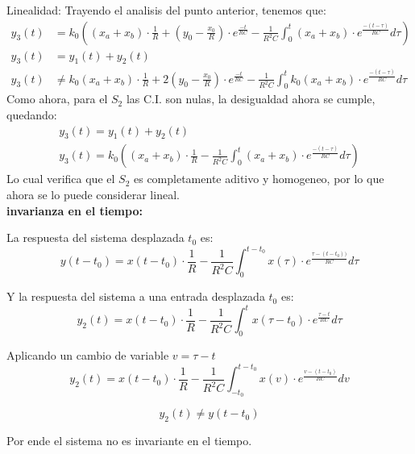 \documentclass[12pt,a4paper]{report}
\begin{document}
\begin{enumerate}[label=\alph*)]
      Linealidad: Trayendo el analisis del punto anterior, tenemos que:
      \begin{align*}
        y_3(t) &= k_0\left((x_a + x_b) \cdot \frac{1}{R} + \left(y_0 - \frac{x_0}{R}\right) \cdot e^{\frac{-t}{RC}} -
          \frac{1}{R^2C} \int_{0}^{t} (x_a + x_b) \cdot e^{\frac{-(t-\tau)}{RC}} d\tau\right)\\[12pt]
        y_3(t) &= y_1(t) + y_2(t)\\[6pt]
        y_3(t) &\neq k_0(x_a + x_b) \cdot \frac{1}{R} + 2\left(y_0 - \frac{x_0}{R}\right) \cdot
          e^{\frac{-t}{RC}} - \frac{1}{R^2C} \int_{0}^{t} k_0(x_a + x_b) \cdot e^{\frac{-(t-\tau)}{RC}} d\tau
      \end{align*}
      Como ahora, para el $S_2$ las C.I. son nulas, la desigualdad ahora se cumple, quedando:
      \begin{gather*}
        y_3(t) = y_1(t) + y_2(t)\\[6pt]
        y_3(t) = k_0\left((x_a + x_b) \cdot \frac{1}{R} - \frac{1}{R^2C} \int_{0}^{t} (x_a + x_b) \cdot
        e^{\frac{-(t-\tau)}{RC}} d\tau\right)
      \end{gather*}
      Lo cual verifica que el $S_2$ es completamente aditivo y homogeneo, por lo que ahora se lo puede considerar
      lineal.\\

      \textbf{invarianza en el tiempo:}

      La respuesta del sistema desplazada $t_0$ es:
      $$y(t - t_0) = x(t - t_0) \cdot \frac{1}{R}- \frac{1}{R^2C} \int_{0}^{t - t_0} x(\tau) \cdot
      e^{\frac{\tau-(t - t_0))}{RC}} d\tau$$

      Y la respuesta del sistema a una entrada desplazada $t_0$ es:
      $$y_2(t) = x(t-t_0) \cdot \frac{1}{R}- \frac{1}{R^2C} \int_{0}^{t} x(\tau - t_0) \cdot
      e^{\frac{\tau-t}{RC}} d\tau$$

      Aplicando un cambio de variable $v= \tau-t$
      $$y_2(t) = x(t-t_0) \cdot \frac{1}{R}- \frac{1}{R^2C} \int_{-t_0}^{t-t_0} x(v) \cdot
      e^{\frac{v-(t-t_0)}{RC}} dv$$

      $$y_2(t) \neq y(t-t_0)$$

      Por ende el sistema no es invariante en el tiempo.


\end{enumerate}
\end{document}
